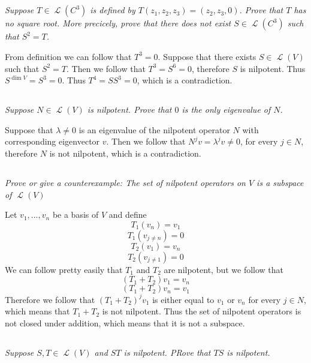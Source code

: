 \documentclass[11pt,oneside,titlepage]{book}
\DeclareMathOperator \map {\mathcal {L}}
\begin{document}
\subsection{}

\textit{Suppose $T \in \map(C^3)$ is defined by $T(z_1, z_2, z_3) = (z_2, z_3, 0)$. Prove that
  $T$ has no square root. More precicely, prove that there does not exist $S \in \map(C^3)$ such
  that $S^2 = T$.}

From definition we can follow that $T^3 = 0$. Suppose that there exists $S \in \map(V)$ such that
$S^2 = T$. Then we follow that $T^3 = S^6 = 0$, therefore $S$ is nilpotent. Thus
$S^{\dim V} = S^3 = 0$. Thus $T^4 = S S^3 = 0$, which is a contradiction.

\subsection{}

\textit{Suppose $N \in \map(V)$ is nilpotent. Prove that $0$ is the only eigenvalue of $N$.}

Suppose that $\lambda \neq 0$ is an eigenvalue of the nilpotent operator $N$ with
corresponding eigenvector $v$. Then we follow that $N^j v = \lambda^j v \neq 0$, for every
$j \in N$, therefore $N$ is not nilpotent, which is a contradiction.


\subsection{}

\textit{Prove or give a counterexample: The set of nilpotent operators on $V$ is a subspace of
  $\map(V)$}

Let $v_1, ..., v_n$ be a basis of $V$ and define
$$T_1(v_n) = v_1$$
$$T_1(v_{j \neq n}) = 0$$
$$T_2(v_1) = v_n$$
$$T_2(v_{j \neq 1}) = 0$$
We can follow pretty easily that $T_1$ and $T_2$ are nilpotent, but we follow that 
$$(T_1 + T_2) v_1  = v_n$$
$$(T_1 + T_2) v_n  = v_1$$
Therefore we follow that $(T_1 + T_2)^j v_1$ is either equal to $v_1$ or $v_n$ for every $j \in N$,
which means that $T_1 + T_2$ is not nilpotent. Thus the set of nilpotent operators is
not closed under addition, which means that it is not a subspace.

\subsection{}

\textit{Suppose $S, T \in \map(V)$ and $ST$ is nilpotent. PRove that $TS$ is nilpotent.}
\end{document}
